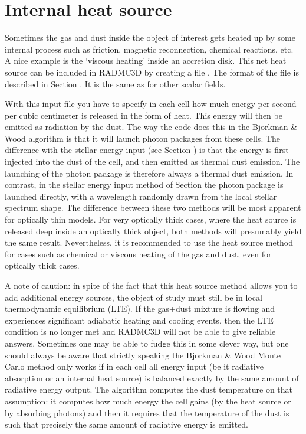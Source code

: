 \documentclass[letterpaper,10pt,english]{sphinxmanual}
\begin{document}
\section{Internal heat source}
\label{\detokenize{stars:internal-heat-source}}\label{\detokenize{stars:sec-internal-source}}
Sometimes the gas and dust inside the object of interest gets heated up by
some internal process such as friction, magnetic reconnection, chemical
reactions, etc. A nice example is the ‘viscous heating’ inside an
accretion disk. This net heat source can be included in RADMC\sphinxhyphen{}3D by creating
a file . The format of the file is described in
Section {\hyperref[\detokenize{inputoutputfiles:sec-heatsource}]{}}. It is the same as for other scalar fields.

With this input file you have to specify in each cell how much energy per
second per cubic centimeter is released in the form of heat. This energy
will then be emitted as radiation by the dust. The way the code does this in
the Bjorkman \& Wood algorithm is that it will launch photon packages from
these cells. The difference with the stellar energy input (see Section
{\hyperref[\detokenize{stars:sec-distrib-of-stars}]{}}) is that the energy is first injected into the
dust of the cell, and then emitted as thermal dust emission. The launching
of the photon package is therefore always a thermal dust emission. In
contrast, in the stellar energy input method of Section
{\hyperref[\detokenize{stars:sec-distrib-of-stars}]{}} the photon package is launched directly, with a
wavelength randomly drawn from the local stellar spectrum shape. The
difference between these two methods will be most apparent for optically
thin models. For very optically thick cases, where the heat source is
released deep inside an optically thick object, both methods will
presumably yield the same result. Nevertheless, it is recommended to
use the heat source method for cases such as chemical or viscous heating
of the gas and dust, even for optically thick cases.

A note of caution: in spite of the fact that this heat source method allows
you to add additional energy sources, the object of study must still be in
local thermodynamic equilibrium (LTE). If the gas+dust mixture is flowing
and experiences significant adiabatic heating and cooling events, then the
LTE condition is no longer met and RADMC\sphinxhyphen{}3D will not be able to give
reliable answers. Sometimes one may be able to fudge this in some clever
way, but one should always be aware that strictly speaking the Bjorkman \&
Wood Monte Carlo method only works if in each cell all energy input (be it
radiative absorption or an internal heat source) is balanced exactly by the
same amount of radiative energy output. The algorithm  computes
the dust temperature on that assumption: it computes how much energy the
cell gains (by the heat source or by absorbing photons) and then it requires
that the temperature of the dust is such that precisely the same amount of
radiative energy is emitted.
\end{document}
